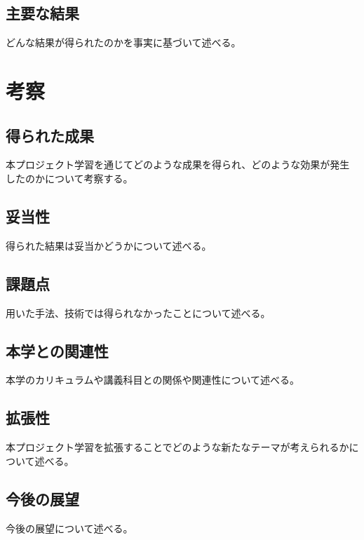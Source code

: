 \section{主要な結果}
どんな結果が得られたのかを事実に基づいて述べる。

\chapter{考察}
\section{得られた成果}
本プロジェクト学習を通じてどのような成果を得られ、どのような効果が発生したのかについて考察する。

\section{妥当性}
得られた結果は妥当かどうかについて述べる。

\section{課題点}
用いた手法、技術では得られなかったことについて述べる。

\section{本学との関連性}
本学のカリキュラムや講義科目との関係や関連性について述べる。

\section{拡張性}
本プロジェクト学習を拡張することでどのような新たなテーマが考えられるかについて述べる。

\section{今後の展望}
今後の展望について述べる。

\newpage\clearpage
\vspace*{-20pt}
\printbibliography[segment=\therefsegment,heading=subbibliography]
